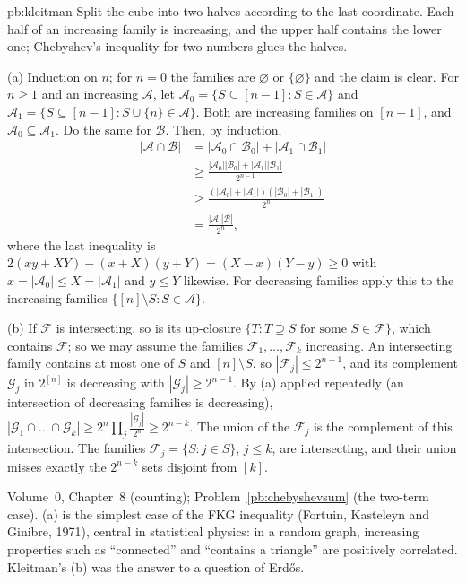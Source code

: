 \begin{solution}{pb:kleitman}
\idea Split the cube into two halves according to the last coordinate. Each half of an increasing family is increasing, and the
upper half contains the lower one; Chebyshev's inequality for two numbers glues the halves.

\writeup (a) Induction on $n$; for $n=0$ the families are $\varnothing$ or $\{\varnothing\}$ and the claim is clear. For $n\ge1$ and an increasing $\mathcal A$, let
$\mathcal A_0=\{S\subseteq[n-1]:S\in\mathcal A\}$ and $\mathcal A_1=\{S\subseteq[n-1]:S\cup\{n\}\in\mathcal A\}$. Both are increasing families on $[n-1]$, and $\mathcal A_0\subseteq\mathcal A_1$. Do
the same for $\mathcal B$. Then, by induction,
\[
\begin{aligned}
|\mathcal A\cap\mathcal B|&=|\mathcal A_0\cap\mathcal B_0|+|\mathcal A_1\cap\mathcal B_1|\\
&\ge\frac{|\mathcal A_0||\mathcal B_0|+|\mathcal A_1||\mathcal B_1|}{2^{n-1}}\\
&\ge\frac{(|\mathcal A_0|+|\mathcal A_1|)(|\mathcal B_0|+|\mathcal B_1|)}{2^n}\\
&=\frac{|\mathcal A||\mathcal B|}{2^n},
\end{aligned}
\]
where the last inequality is $2(xy+XY)-(x+X)(y+Y)=(X-x)(Y-y)\ge0$ with $x=|\mathcal A_0|\le X=|\mathcal A_1|$ and $y\le Y$ likewise. For decreasing
families apply this to the increasing families $\{[n]\setminus S:S\in\mathcal A\}$.

(b) If $\mathcal F$ is intersecting, so is its up-closure $\{T:T\supseteq S\text{ for some }S\in\mathcal F\}$, which contains $\mathcal F$; so we may assume the
families $\mathcal F_1,\dots,\mathcal F_k$ increasing. An intersecting family contains at most one of $S$ and $[n]\setminus S$, so $|\mathcal F_j|\le2^{n-1}$, and its complement
$\mathcal G_j$ in $2^{[n]}$ is decreasing with $|\mathcal G_j|\ge2^{n-1}$. By (a) applied repeatedly (an intersection of decreasing families is decreasing),
$|\mathcal G_1\cap\dots\cap\mathcal G_k|\ge2^n\prod_j\frac{|\mathcal G_j|}{2^n}\ge2^{n-k}$. The union of the $\mathcal F_j$ is the complement of this intersection. The families
$\mathcal F_j=\{S:j\in S\}$, $j\le k$, are intersecting, and their union misses exactly the $2^{n-k}$ sets disjoint from $[k]$.

\tools Volume~0, Chapter~8 (counting); Problem~\ref{pb:chebyshevsum} (the two-term case).
\leads (a) is the simplest case of the FKG inequality (Fortuin, Kasteleyn and Ginibre, 1971), central in statistical physics: in a
random graph, increasing properties such as ``connected'' and ``contains a triangle'' are positively correlated. Kleitman's (b)
was the answer to a question of Erdős.
\end{solution}

